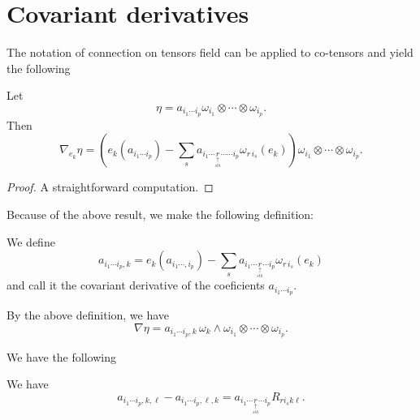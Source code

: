 \section{Covariant derivatives}\label{Cov_derivatives}
The notation of connection on tensors field can be applied to co-tensors and yield the following

\begin{lemma} Let
\[
\eta=a_{i_1\cdots i_p}\omega_{i_1}\otimes\cdots\otimes\omega_{i_p}.
\]
Then
\[
\nabla_{e_k}\eta=\left(e_k(a_{i_1\cdots i_p})-\sum_s a_{i_1\cdots \underset{\underset{sth}{\uparrow}}r\cdots\cdots i_p}\omega_{r\, i_s}(e_k)\right)
\omega_{i_1}\otimes\cdots\otimes\omega_{i_p}.
\]
\end{lemma}

\begin{proof} A straightforward computation. \end{proof}





Because of the above result, we make the following definition:

\begin{definition}
We define 
\[
a_{i_1\cdots i_p,k}=e_k(a_{i_1\cdots,i_p})-\sum_s a_{i_1\cdots \underset{\underset{sth}{\uparrow}}r\cdots i_p}\omega_{r\, i_s}(e_k)
\]
and call it the covariant derivative of the coeficients $a_{i_1\cdots i_p}$.
\end{definition}


By the above definition, we have
\[
\nabla \eta=a_{i_1\cdots i_p,k}\,\omega_{k}\wedge \omega_{i_1}\otimes\cdots\otimes\omega_{i_p}.
\]


We have the following

\begin{theorem}\label{thm5} We have
\[
a_{i_1\cdots i_p,k,\ell}-a_{i_1\cdots i_p,\ell,k}
=
a_{i_1\cdots \underset{\underset{sth}{\uparrow}}r\cdots i_p} R_{r i_s k\ell}.
\]
\end{theorem}

